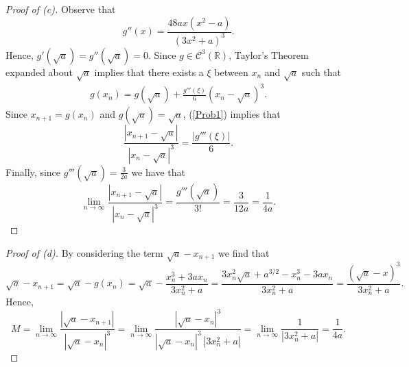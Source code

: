 \documentclass[8pt]{article}
\theoremstyle{definition}
\begin{document}
\begin{proof}[Proof of (c)]
Observe that $$g''(x) = \frac{48 ax (x^2 - a)}{(3x^2 + a)^3}.$$ Hence, $g'(\sqrt{a}) = g'' (\sqrt{a}) = 0$. Since $g \in \mathcal{C}^{3} (\mathbb{R})$, Taylor's Theorem expanded about $\sqrt{a}$ implies that there exists a $\xi$ between $x_n$ and $\sqrt{a}$ such that \begin{align}
g(x_n) = g(\sqrt{a}) + \frac{g'''(\xi)}{6} (x_n - \sqrt{a})^3. \label{Prob1}
\end{align}
Since $x_{n + 1} = g(x_n)$ and $g(\sqrt{a}) = \sqrt{a}$, (\ref{Prob1}) implies that $$\frac{|x_{n + 1} - \sqrt{a}|}{|x_n - \sqrt{a}|^3} = \frac{| g''' (\xi)|}{6}.$$ Finally, since $g'''(\sqrt{a}) = \frac{3}{2a}$ we have that $$\lim_{n \to \infty} \frac{|x_{n + 1} - \sqrt{a}|}{|x_n - \sqrt{a}|^3} = \frac{g'''(\sqrt{a})}{3!} = \frac{3}{12 a} = \frac{1}{4a}.$$
\end{proof}

\begin{proof}[Proof of (d)]
By considering the term $\sqrt{a} - x_{n + 1}$ we find that $$\sqrt{a} - x_{n + 1} = \sqrt{a} - g(x_n) = \sqrt{a} - \frac{x_{n}^{3} + 3 a x_n}{3x_{n}^2 + a} = \frac{3x_{n}^{2} \sqrt{a} + a^{3/2} - x_{n}^3 - 3 a x_n}{3x_{n}^2 + a} = \frac{(\sqrt{a} - x)^3}{3x_{n}^2 + a}.$$ Hence, $$M = \lim_{n \to \infty} \frac{|\sqrt{a} - x_{n+1}|}{|\sqrt{a} - x_{n}|^3} = \lim_{n \to \infty} \frac{|\sqrt{a} - x_n|^3}{|\sqrt{a} - x_n|^3 \ | 3 x_{n}^2 + a|} = \lim_{n \to \infty} \frac{1}{|3x_{n}^2 + a|} = \frac{1}{4a}.$$
\end{proof}
\end{document}
